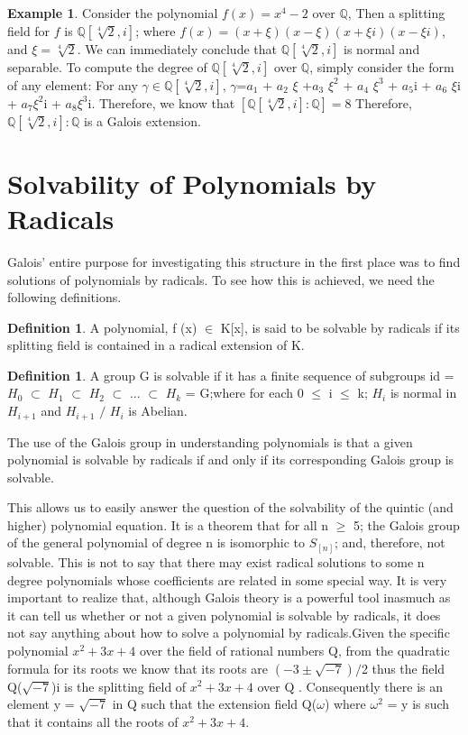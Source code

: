 \documentclass[12pt]{article}
\theoremstyle{definition}
\newtheorem{defn}[thm]{Definition}
\newtheorem{exmp}[thm]{Example}
\theoremstyle{remark}
\begin{document}
\begin{exmp}
Consider the polynomial $f(x) = x^{4}-2$ over $\mathbb{Q}$, Then a splitting field for $f$ is $\mathbb{Q}[\sqrt[4]{2},i]$; where $f(x) = (x + \xi)(x - \xi)(x + \xi i)(x - \xi i)$, and $\xi = \sqrt[4]{2}$. We can immediately conclude that $\mathbb{Q}[\sqrt[4]{2}, i]$ is normal and separable. To compute the degree
of $\mathbb{Q}[\sqrt[4]{2}, i]$ over $\mathbb{Q}$, simply consider the form of any element: For any $\gamma \in \mathbb{Q}[\sqrt[4]{2}, i]$, $\gamma$=$a_{1}$ + $a_{2}$ $\xi$ +$a_{3}$ $\xi^{2}$ + $a_{4}$ $\xi^{3}$ + $a_{5}$i + $a_{6}$ $\xi$i + $a_{7}\xi^{2}$i + $a_{8}\xi^{3}$i.
Therefore, we know that $[\mathbb{Q}[\sqrt[4]{2}, i]:\mathbb{Q}] = 8$ Therefore, $\mathbb{Q}[\sqrt[4]{2}, i]:\mathbb{Q}$ is a Galois extension.
\end{exmp}


\section{Solvability of Polynomials by Radicals}

 Galois' entire purpose for investigating this structure in the first place was to find solutions of polynomials
by radicals. To see how this is achieved, we need the following definitions.
\begin{defn}
A polynomial, f (x) $\in$ K[x], is said to be solvable by radicals if its
splitting field is contained in a radical extension of K.
\end{defn}


\begin{defn}
A group G is solvable if it has a finite sequence of subgroups {id} = $H_{0}$ $\subset$ $H_{1}$ $\subset$ $H_{2}$ $\subset$ ... $\subset$
$H_{k}$ = G;where for each 0 $\leq$ i $\leq$ k; $H_{i}$ is normal in $H_{i+1}$ and $H_{i+1}$ $/$ $H_{i}$ is Abelian. 
\end{defn}
The use of the Galois group in understanding polynomials is that a given polynomial is solvable by
radicals if and only if its corresponding Galois group is solvable.


This allows us to easily answer the question
of the solvability of the quintic (and higher) polynomial equation. It is a theorem that for all n $\geq$ 5; the
Galois group of the general polynomial of degree n is isomorphic to $S_[n]$; and, therefore, not solvable. This is
not to say that there may exist radical solutions to some n degree polynomials whose coefficients are related
in some special way. It is very important to realize that,
although Galois theory is a powerful tool inasmuch as it can tell us whether or not a given polynomial is
solvable by radicals, it does not say anything about how to solve a polynomial by radicals.Given the specific polynomial $x^{2}+3x+4$ over the field of rational numbers Q, from the quadratic formula for its roots we know that its roots are $( -3 \pm \sqrt{-7} )/$2 thus the field Q($\sqrt{-7}$)i is the splitting field of $x^{2}+3x+4$ over Q . Consequently there is an element y = $\sqrt{-7}$ in Q
such that the extension field Q($\omega$) where $\omega^{2}$ = y is such that it contains all the roots of
$x^{2}+3x+4$.
\end{document}
